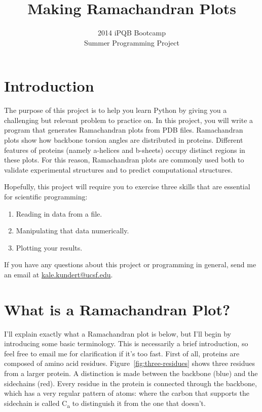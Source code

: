 \documentclass{article}
\newcommand{\calpha}{C\textsubscript{\textgreek{a}}}
\newcommand{\ahelices}{\textgreek{a}-helices}
\newcommand{\bsheets}{\textgreek{b}-sheets}
\begin{document}
\title{Making Ramachandran Plots}
\author{2014 iPQB Bootcamp\\Summer Programming Project}
\date{}
\maketitle{}

\section{Introduction}

The purpose of this project is to help you learn Python by giving you a
challenging but relevant problem to practice on.  In this project,
you will write a
program that generates Ramachandran plots from PDB files.  Ramachandran plots 
show how backbone torsion angles are distributed in proteins.  Different 
features of proteins (namely \ahelices{} and \bsheets{}) occupy distinct 
regions in these plots.  For this reason, Ramachandran plots are commonly used 
both to validate experimental structures and to predict computational 
structures.

Hopefully, this project will require you to exercise three skills that are 
essential for scientific programming:

\begin{enumerate}
 \item Reading in data from a file.
 \item Manipulating that data numerically.
 \item Plotting your results.
\end{enumerate}

If you have any questions about this project or programming in general, send me 
an email at \href{mailto:kale.kundert@ucsf.edu}{kale.kundert@ucsf.edu}.

\section{What is a Ramachandran Plot?}

I'll explain exactly what a Ramachandran plot is below, but I'll begin by 
introducing some basic terminology.  This is necessarily a brief introduction, 
so feel free to email me for clarification if it's too fast.  First of all, 
proteins are composed of amino acid residues.  Figure~\ref{fig:three-residues} 
shows three residues from a larger protein.  A distinction is made between the 
backbone (blue) and the sidechains (red).  Every residue in the protein is 
connected through the backbone, which has a very regular pattern of atoms: 
 where the 
carbon that supports the sidechain is called \calpha{} to distinguish it from 
the one that doesn't.
\end{document}
